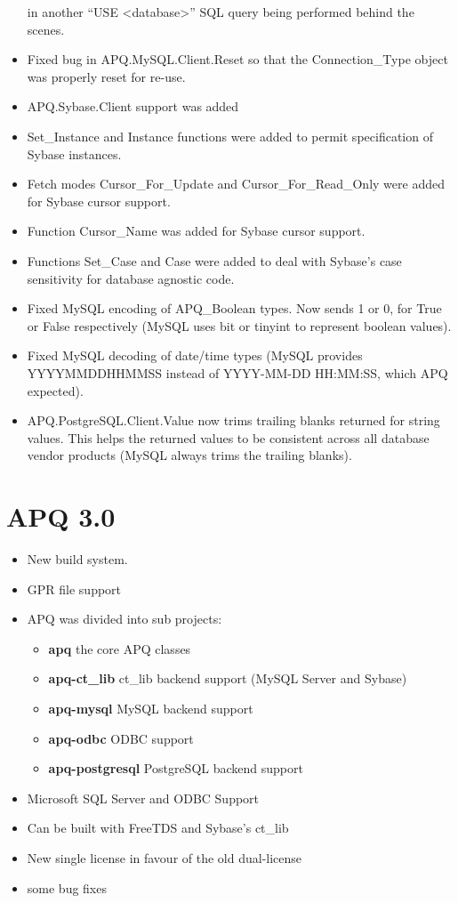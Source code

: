 \documentclass[english,letterpaper]{book}
\begin{document}
\begin{itemize}
         in another ``USE <database>'' SQL query being performed behind
         the scenes.
   \item Fixed bug in APQ\-.MySQL\-.Client\-.Reset so that the Connection\_Type object
         was properly reset for re-use.
   \item APQ.Sybase.Client support was added
   \item Set\_Instance and Instance functions were added to permit specification
         of Sybase instances.
   \item Fetch modes Cursor\_For\_Update and Cursor\_For\_Read\_Only were added
         for Sybase cursor support.
   \item Function Cursor\_Name was added for Sybase cursor support.
   \item Functions Set\_Case and Case were added to deal with Sybase's case
         sensitivity for database agnostic code.
   \item Fixed MySQL encoding of APQ\_Boolean types. Now sends 1 or 0, for
         True or False respectively (MySQL uses bit or tinyint to represent
         boolean values).
   \item Fixed MySQL decoding of date/time types (MySQL provides YYYYMMDDHHMMSS
         instead of YYYY-MM-DD HH:MM:SS, which APQ expected).
   \item APQ.PostgreSQL.Client.Value now trims trailing blanks returned for
         string values. This helps the returned values to be consistent across
         all database vendor products (MySQL always trims the trailing blanks).
\end{itemize}

\section*{APQ 3.0}
\begin{itemize}
	\item New build system.
	\item GPR file support
	\item APQ was divided into sub projects:
		\begin{itemize}
			\item \textbf{apq} the core APQ classes
			\item \textbf{apq-ct\_lib} ct\_lib backend support (MySQL Server and Sybase)
			\item \textbf{apq-mysql} MySQL backend support
			\item \textbf{apq-odbc} ODBC support
			\item \textbf{apq-postgresql} PostgreSQL backend support
		\end{itemize}
	\item Microsoft SQL Server and ODBC Support
	\item Can be built with FreeTDS and Sybase's ct\_lib
	\item New single license in favour of the old dual-license
	\item some bug fixes
\end{itemize}
\end{document}
